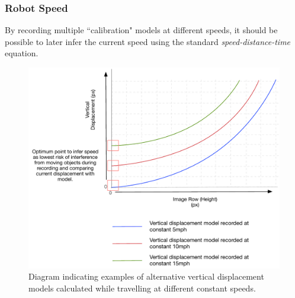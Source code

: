 \documentclass[10pt, compress]{beamer}
\begin{document}
\begin{frame}[fragile]
  \frametitle{Robot Speed}
  
\vspace{-10pt}

By recording multiple ``calibration" models at different speeds, it should be possible to later infer the current speed using the standard \textit{speed-distance-time} equation.

  \begin{figure}[ht!]
\centering
\includegraphics[scale=0.3]{speed_graph}
\caption{Diagram indicating examples of alternative vertical displacement models calculated while travelling at different constant speeds.}
  \end{figure}
  
  
\end{frame}
\end{document}
